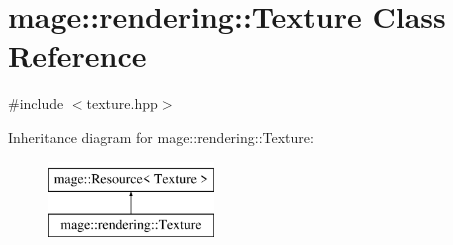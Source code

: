 \hypertarget{classmage_1_1rendering_1_1_texture}{}\section{mage\+:\+:rendering\+:\+:Texture Class Reference}
\label{classmage_1_1rendering_1_1_texture}


{\ttfamily \#include $<$texture.\+hpp$>$}

Inheritance diagram for mage\+:\+:rendering\+:\+:Texture\+:\begin{figure}[H]
\begin{center}
\leavevmode
\includegraphics[height=2.000000cm]{classmage_1_1rendering_1_1_texture}
\end{center}
\end{figure}

